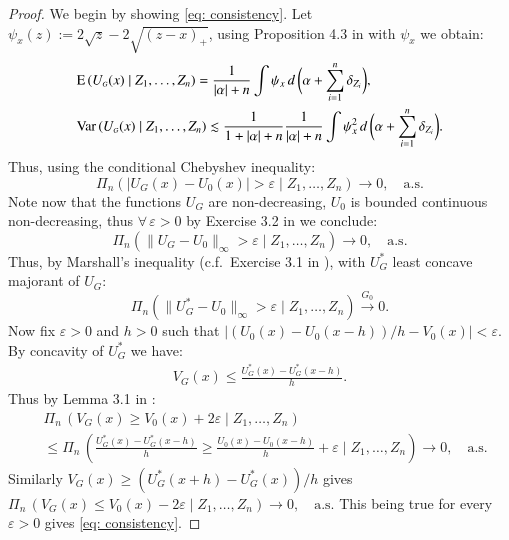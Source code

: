 	\begin{proof}
		We begin by showing \eqref{eq: consistency}. Let $\psi_x(z) := 2 \sqrt{z} - 2 \sqrt{(z-x)_+}$, using Proposition 4.3 in \cite{4} with $\psi_x$ we obtain:
		\begin{align*}
			&\mathrm{E} \, (U_{\scriptscriptstyle{G}}(x) \mid Z_1,\ldots,Z_n) = \frac{1}{|\alpha|+n}\int \psi_x  \, d \, \bigg(\alpha + \sum_{i=1}^n \delta_{Z_i} \bigg), \\
			&\mathrm{Var} \, (U_{\scriptscriptstyle{G}}(x) \mid Z_1,\ldots,Z_n) \lesssim \frac{1}{1+|\alpha|+n} \frac{1}{|\alpha|+n} \int \psi_x^2 \,  d \, \bigg(\alpha + \sum_{i=1}^n \delta_{Z_i} \bigg).
		\end{align*}
		Thus, using the conditional Chebyshev inequality:
		\[
		\Pi_n \left( \lvert U_{\scriptscriptstyle{G}} (x) - U_0(x) \rvert > \varepsilon \mid Z_1, \ldots, Z_n \right) 
		\rightarrow 0, \quad \text{a.s.}
		\]
		Note now that the functions \(U_{\scriptscriptstyle{G}}\) are non-decreasing, \(U_0\) is bounded continuous non-decreasing, thus \(\forall \, \varepsilon > 0\) by Exercise 3.2 in \cite{2} we conclude: 
		$$\Pi_n \left( \| U_{\scriptscriptstyle{G}} - U_0 \|_{\infty} > \varepsilon \mid Z_1, \ldots, Z_n \right)  \to 0, \quad \text{a.s.}$$
		Thus, by Marshall's inequality (c.f.\ Exercise 3.1 in \cite{2}), with $ U_{\scriptscriptstyle{G}}^*$ least concave majorant of $ U_{\scriptscriptstyle{G}}$:
		\[
		\Pi_n \left(\lVert U_{\scriptscriptstyle{G}}^* - U_0 \rVert_\infty > \varepsilon \mid Z_1, \ldots, Z_n \right) \stackrel{G_0}{\rightarrow} 0.
		\]
		Now fix $\varepsilon >0$ and $h >0$ such that $| (U_0(x)- U_0(x-h))/h - V_0(x)| < \varepsilon$. By concavity of $U^*_{\scriptscriptstyle{G}}$ we have:
		\begin{align*}
			V_{\scriptscriptstyle{G}}(x) \leq \frac{U^*_{\scriptscriptstyle{G}}(x) - U^*_{\scriptscriptstyle{G}}(x-h)}{h}.
		\end{align*}
		Thus by Lemma 3.1 in \cite{2}:
		\begin{align*}
			&\Pi_n \, (V_{\scriptscriptstyle{G}}(x) \geq V_0(x) + 2 \varepsilon \mid Z_1,\ldots, Z_n) \\
			&\leq \Pi_n \, \left( \frac{U^*_{\scriptscriptstyle{G}} (x) - U^*_{\scriptscriptstyle{G}} (x-h)}{h} \geq \frac{U_{0} (x) - U_{0} (x-h)}{h} +\varepsilon \mid Z_1, \ldots, Z_n \right) \to 0, \quad \text{a.s.} 
		\end{align*}		
		Similarly $V_{\scriptscriptstyle{G}}(x) \geq (U^*_{\scriptscriptstyle{G}}(x+h) - U^*_{\scriptscriptstyle{G}}(x))/h$ gives $\Pi_n \, (V_{\scriptscriptstyle{G}}(x) \leq V_0(x) - 2 \varepsilon \mid Z_1,\ldots, Z_n) \to 0, \quad \text{a.s.}$
		This being true for every $\varepsilon >0$ gives \eqref{eq: consistency}. 
		

\end{proof}

